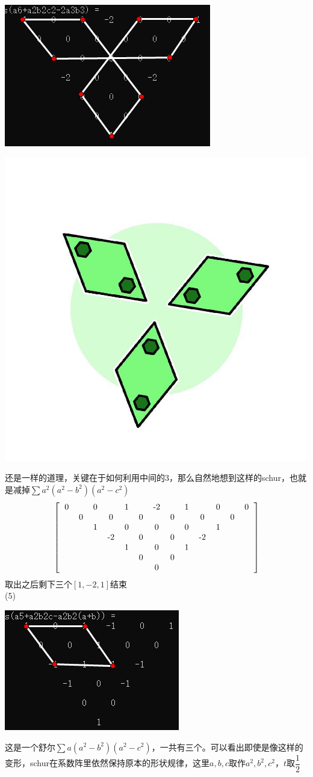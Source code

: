 \documentclass[UTF8]{ctexart}
\begin{document}
\begin{center}
	\includegraphics[width=0.5\linewidth]{230}
\end{center}
\begin{center}
	\includegraphics[width=0.4\linewidth]{210}
\end{center}
还是一样的道理，关键在于如何利用中间的3，那么自然地想到这样的schur，也就是减掉$ \displaystyle  \sum a^{2}(a^{2}-b^{2})(a^{2}-c^{2}) $
\renewcommand*{\arraystretch}{1.732}\[\left[\begin{matrix}
	\begin{tabular}{ccccccccccccc}
		0& &0& &1& &-2& &1& &0& &0\\
		&0& &0& &0& &0& &0& &0&\\
		& &1& &0& &0& &0& &1& &\\
		& & &-2& &0& &0& &-2& & &\\
		& & & &1& &0& &1& & & &\\
		& & & & &0& &0& & & & &\\
		& & & & & &0& & & & & &\\
	\end{tabular}
\end{matrix}\right]\]
取出之后剩下三个$ [1,-2,1] $结束\\
(5)\begin{center}
	\includegraphics[width=0.5\linewidth]{240}
\end{center}
这是一个舒尔$ \displaystyle  \sum a(a^{2}-b^{2})(a^{2}-c^{2}) $，一共有三个。可以看出即使是像这样的变形，schur在系数阵里依然保持原本的形状规律，这里$ a,b,c $取作$ a^{2},b^{2},c^{2} $，$ t $取$ \dfrac{1}{2} $
\end{document}
